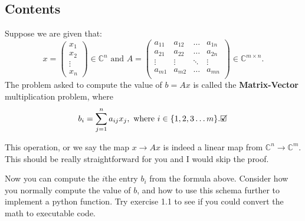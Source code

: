 \subsection*{Contents}
\begin{definition}
  Suppose we are given that:
  \[
    x = \begin{pmatrix} x_1\\x_2\\ \vdots\\ x_n \end{pmatrix} \in \mathbb{C}^{n} \text{ and } 
      A = \begin{pmatrix} 
      a_{11} & a_{12} & \ldots & a_{1n} \\
    a_{21} & a_{22} & \ldots & a_{2n} \\ 
    \vdots & \vdots & \ddots & \vdots \\
    a_{m1} & a_{m2} & \ldots & a_{mn} \\  
    \end{pmatrix} \in \mathbb{C}^{m \times n}
  .\] 
  The problem asked to compute the value of $b = Ax$ is called the \textbf{Matrix-Vector} multiplication problem, where
  \[
    b_i = \sum_{j = 1}^{n} a_{ij}x_j, \text{ where } i \in \{1, 2, 3 \ldots m\} 
    .\checked\] 
\end{definition}
This operation, or we say the map $x \to  Ax$ is indeed a linear map from $\mathbb{C}^{n} \to \mathbb{C}^{m}$. 
This should be really straightforward for you and I would skip the proof. \medskip

\noindent Now you can compute the \(i\)the entry \(b_i\) from the formula above. Consider how you normally compute the value of \(b\), and how to use this schema further to implement a python function. Try exercise 1.1 to see if you could convert the math to executable code.
